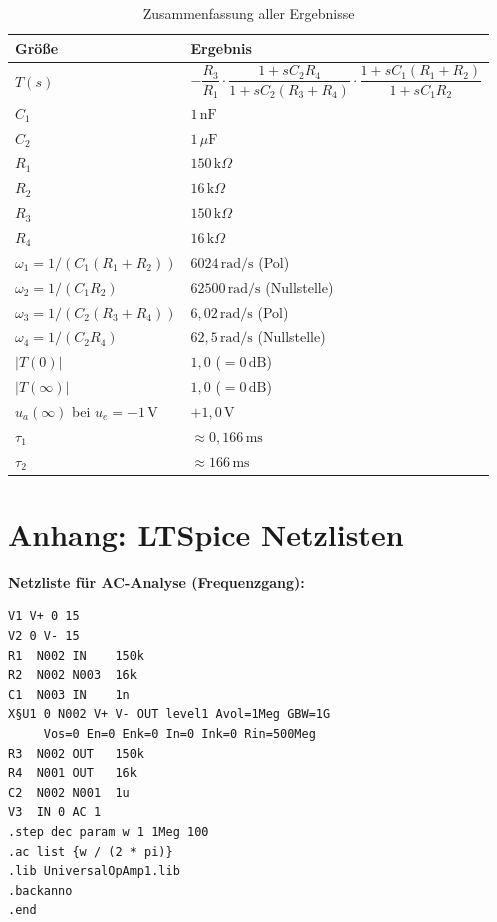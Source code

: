 \documentclass[12pt,a4paper]{article}
\begin{document}
\begin{table}[H]
  \centering
  \caption{Zusammenfassung aller Ergebnisse}
  \begin{tabular}{p{6cm}l}
    \toprule
    Größe & Ergebnis \\
    \midrule
    $T(s)$ &
      $-\dfrac{R_3}{R_1}\cdot
       \dfrac{1+sC_2R_4}{1+sC_2(R_3+R_4)}\cdot
       \dfrac{1+sC_1(R_1+R_2)}{1+sC_1R_2}$ \\[8pt]
    $C_1$ & $1\,\text{nF}$ \\
    $C_2$ & $1\,\mu\text{F}$ \\
    $R_1$ & $150\,\text{k}\Omega$ \\
    $R_2$ & $16\,\text{k}\Omega$ \\
    $R_3$ & $150\,\text{k}\Omega$ \\
    $R_4$ & $16\,\text{k}\Omega$ \\
    $\omega_1 = 1/(C_1(R_1+R_2))$ & $6024\,\text{rad/s}$ (Pol) \\
    $\omega_2 = 1/(C_1 R_2)$      & $62500\,\text{rad/s}$ (Nullstelle) \\
    $\omega_3 = 1/(C_2(R_3+R_4))$ & $6{,}02\,\text{rad/s}$ (Pol) \\
    $\omega_4 = 1/(C_2 R_4)$      & $62{,}5\,\text{rad/s}$ (Nullstelle) \\
    $|T(0)|$ & $1{,}0$ ($= 0\,\text{dB}$) \\
    $|T(\infty)|$ & $1{,}0$ ($= 0\,\text{dB}$) \\
    $u_a(\infty)$ bei $u_e = -1\,\text{V}$ & $+1{,}0\,\text{V}$ \\
    $\tau_1$ & $\approx 0{,}166\,\text{ms}$ \\
    $\tau_2$ & $\approx 166\,\text{ms}$ \\
    \bottomrule
  \end{tabular}
\end{table}

\section*{Anhang: LTSpice Netzlisten}

\textbf{Netzliste für AC-Analyse (Frequenzgang):}

\begin{verbatim}
V1 V+ 0 15
V2 0 V- 15
R1  N002 IN    150k
R2  N002 N003  16k
C1  N003 IN    1n
X§U1 0 N002 V+ V- OUT level1 Avol=1Meg GBW=1G
     Vos=0 En=0 Enk=0 In=0 Ink=0 Rin=500Meg
R3  N002 OUT   150k
R4  N001 OUT   16k
C2  N002 N001  1u
V3  IN 0 AC 1
.step dec param w 1 1Meg 100
.ac list {w / (2 * pi)}
.lib UniversalOpAmp1.lib
.backanno
.end
\end{verbatim}
\end{document}
